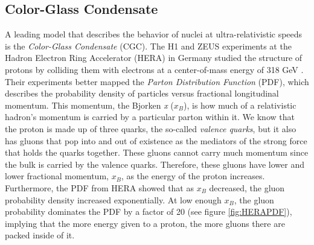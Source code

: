 \subsection{Color-Glass Condensate}
A leading model that describes the behavior of nuclei at ultra-relativistic speeds is the \textit{Color-Glass Condensate} (CGC). The H1 and ZEUS experiments at the Hadron Electron Ring Accelerator (HERA) in Germany studied the structure of protons by colliding them with electrons at a center-of-mass energy of 318 GeV \citep{Abramowicz2015}. Their experiments better mapped the \textit{Parton Distribution Function} (PDF), which describes the probability density of particles versus fractional longitudinal momentum. This momentum, the Bjorken \textit{x} ($x_{B}$), is how much of a relativistic hadron's momentum is carried by a particular parton within it. We know that the proton is made up of three quarks, the so-called \textit{valence quarks}, but it also has gluons that pop into and out of existence as the mediators of the strong force that holds the quarks together. These gluons cannot carry much momentum since the bulk is carried by the valence quarks. Therefore, these gluons have lower and lower fractional momentum, \textit{$x_{B}$}, as the energy of the proton increases. Furthermore, the PDF from HERA showed that as \textit{$x_{B}$} decreased, the gluon probability density increased exponentially. At low enough \textit{$x_{B}$}, the gluon probability dominates the PDF by a factor of 20 (see figure \ref{fig:HERAPDF}), implying that the more energy given to a proton, the more gluons there are packed inside of it.

